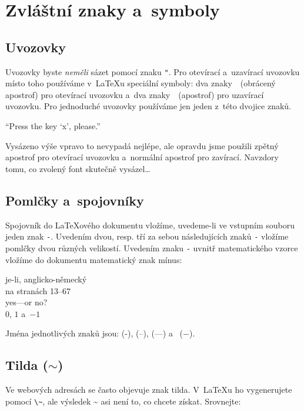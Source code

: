 \section{Zvláštní znaky a~symboly}
 
\subsection{Uvozovky}

Uvozovky byste \emph{neměli} sázet pomocí znaku \verb|"|.
Pro otevírací a~uzavírací uvozovku místo toho používáme v~\LaTeX u speciální symboly:
dva znaky~\textasciigrave~(obrácený apostrof) pro otevírací uvozovku
a~dva znaky~\textquotesingle~(apostrof) pro uzavírací uvozovku. Pro jednoduché
uvozovky používáme jen jeden z~této dvojice znaků.
\begin{example}
``Press the key `x', please.''
\end{example}
Vysázeno výše vpravo to nevypadá nejlépe, ale opravdu jsme použili zpětný
apostrof pro otevírací uvozovku a~normální apostrof pro zavírací.
Navzdory tomu, co zvolený font skutečně vysázel\ldots


\subsection{Pomlčky a~spojovníky}

Spojovník do \LaTeX ového dokumentu vložíme, uvedeme-li ve vstupním souboru
jeden znak \texttt{-}. Uvedením dvou, resp. tří za sebou následujících znaků
\texttt{-} vložíme pomlčky dvou různých velikostí. Uvedením znaku \texttt{-}
uvnitř matematického vzorce vložíme do dokumentu matematický znak mínus:
\index{-}\index{--}\index{---}

\begin{example}
je-li, anglicko-německý\\
na stranách 13--67\\
yes---or no? \\
$0$, $1$ a~$-1$
\end{example}
Jména jednotlivých znaků jsou:
 (-),  (--),  (---)
a~ ($-$).

\subsection{Tilda ($\sim$)}
Ve webových adresách se často objevuje znak tilda. V~\LaTeX u
ho vygenerujete pomocí \verb|\~|, ale výsledek \~{} asi není to,
co chcete získat. Srovnejte:

